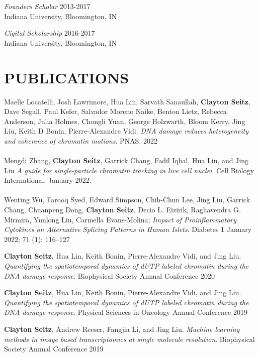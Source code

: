 \documentclass[margin, 10pt]{res} %
\begin{document}
\begin{resume}
{\sl Founders Scholar} \hfill 2013-2017 \\
Indiana University, Bloomington, IN 

{\sl Cigital Scholarship} \hfill 2016-2017 \\
Indiana University, Bloomington, IN 

\section{PUBLICATIONS}

Maelle Locatelli\textsuperscript{\textdagger}, Josh Lawrimore\textsuperscript{\textdagger}, Hua Lin\textsuperscript{\textdagger}, Sarvath Sanaullah, \textbf{Clayton Seitz}, Dave Segall, Paul Kefer, Salvador Moreno Naike, Benton Lietz, Rebecca Anderson, Julia Holmes, Chongli Yuan, George Holzwarth, Bloom Kerry, Jing Liu, Keith D Bonin, Pierre-Alexandre Vidi. \textit{DNA damage reduces heterogeneity and coherence of chromatin motions}. PNAS. 2022
\\
\\
Mengdi Zhang, \textbf{Clayton Seitz}, Garrick Chang, Fadil Iqbal, Hua Lin, and Jing Liu \textit{A guide for single-particle chromatin tracking in live cell nuclei}. Cell Biology International. January 2022.
\\
\\
Wenting Wu, Farooq Syed, Edward Simpson, Chih-Chun Lee, Jing Liu, Garrick Chang, Chuanpeng Dong, \textbf{Clayton Seitz}, Decio L. Eizirik, Raghavendra G. Mirmira, Yunlong Liu, Carmella Evans-Molina; \textit{Impact of Proinflammatory Cytokines on Alternative Splicing Patterns in Human Islets}. Diabetes 1 January 2022; 71 (1): 116–127

\textbf{Clayton Seitz}, Hua Lin, Keith Bonin, Pierre-Alexandre Vidi, and Jing Liu. \textit{Quantifying the spatiotemporal dynamics of dUTP labeled chromatin during the DNA damage response}. Biophysical Society Annual Conference 2020

\textbf{Clayton Seitz}, Hua Lin, Keith Bonin, Pierre-Alexandre Vidi, and Jing Liu. \textit{Quantifying the spatiotemporal dynamics of dUTP labeled chromatin during the DNA damage response}. Physical Sciences in Oncology Annual Conference 2019

\textbf{Clayton Seitz}, Andrew Reeser, Fangjia Li, and Jing Liu. \textit{Machine learning methods in image based transcriptomics at single molecule resolution}. Biophysical Society Annual Conference 2019


\end{resume}
\end{document}
